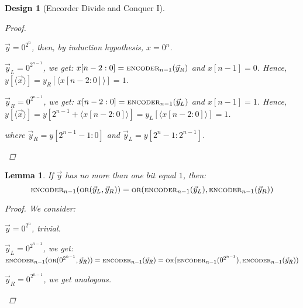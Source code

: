 \documentclass[12pt]{article}
\newcommand{\scr}[1]{{\scriptstyle\textup{#1}}}
\DeclareMathOperator{\OR}{\scr{OR}}
\newcommand{\repr}[1]{\langle{#1}\rangle}
\newtheorem{lemma}[theorem]{Lemma}
\newtheorem{design}[theorem]{Design}
\begin{document}
\begin{design}[Encorder Divide and Conquer I]
\begin{proof}
\begin{compactenum}[(i)]
\begin{compactenum}
        \item $\vec{y}=0^{2^n}$, then, by induction hypothesis, $x=0^n$.
        \item $\vec{y}_L= 0^{2^{n-1}}$, we get: $x[n-2:0]=\scr{ENCODER}_{n-1}(\vec{y}_R)$ and $x[n-1]=0$. Hence, $y[\repr{\vec{x}}]=y_R[\repr{x[n-2:0]}]=1$.
        \item $\vec{y}_R= 0^{2^{n-1}}$, we get: $x[n-2:0]=\scr{ENCODER}_{n-1}(\vec{y}_L)$ and $x[n-1]=1$. Hence, $y[\repr{\vec{x}}]=y[2^{n-1}+\repr{x[n-2:0]}]=y_L[\repr{x[n-2:0]}]=1$.
      \end{compactenum} where $\vec{y}_R=y[2^{n-1}-1:0]$ and $\vec{y}_L=y[2^n-1:2^{n-1}]$.
    \end{compactenum}
  \end{proof}
\end{design}

\begin{lemma}
  If $\vec{y}$ has no more than one bit equal $1$, then: $$\scr{ENCODER}_{n-1}(\OR(\vec{y}_L,\vec{y}_R))=\OR(\scr{ENCODER}_{n-1}(\vec{y}_L),\scr{ENCODER}_{n-1}(\vec{y}_R))$$
  \begin{proof}
    We consider: \begin{compactenum}
      \item $\vec{y}=0^{2^n}$, trivial.
      \item $\vec{y}_L= 0^{2^{n-1}}$, we get: $\scr{ENCODER}_{n-1}(\OR(0^{2^{n-1}},\vec{y}_R))=\scr{ENCODER}_{n-1}(\vec{y}_R)=\OR(\scr{ENCODER}_{n-1}(0^{2^{n-1}}),\scr{ENCODER}_{n-1}(\vec{y}_R))$
      \item $\vec{y}_R= 0^{2^{n-1}}$, we get analogous.
    \end{compactenum}
  \end{proof}
\end{lemma}
\end{document}
